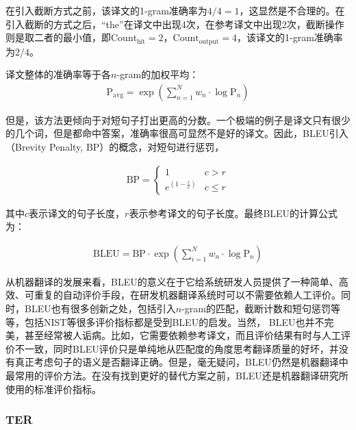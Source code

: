 \parinterval 在引入截断方式之前，该译文的1-gram准确率为$4/4=1$，这显然是不合理的。在引入截断的方式之后，``the''在译文中出现4次，在参考译文中出现2次，截断操作则是取二者的最小值，即$\textrm{Count}_{\textrm{hit}}= 2$，$\textrm{Count}_{\textrm{output}}= 4$，该译文的1-gram准确率为$2/4$。

\parinterval 译文整体的准确率等于各$n$-gram的加权平均：
\begin{eqnarray}
\textrm{P}_{\textrm{avg}}=\exp(\sum_{n=1}^Nw_n\cdot \log{\textrm{P}_n})
\label{eq:1-2}
\end{eqnarray}

\parinterval 但是，该方法更倾向于对短句子打出更高的分数。一个极端的例子是译文只有很少的几个词，但是都命中答案，准确率很高可显然不是好的译文。因此，BLEU引入{\small{}}（Brevity Penalty, BP）的概念，对短句进行惩罚，

\begin{eqnarray}
\textrm{BP}=
\begin{cases}
1& c>r\\
e^{(1-\frac{r}{c})}& c \le r
\end{cases}
\label{eq:1-3}
\end{eqnarray}

\noindent 其中$c$表示译文的句子长度，$r$表示参考译文的句子长度。最终BLEU的计算公式为：

\begin{eqnarray}
\textrm{BLEU}=\textrm{BP} \cdot \exp(\sum_{i=1}^{N}w_n \cdot \log{\textrm{P}_n})
\label{eq:1-4}
\end{eqnarray}

\parinterval 从机器翻译的发展来看，BLEU的意义在于它给系统研发人员提供了一种简单、高效、可重复的自动评价手段，在研发机器翻译系统时可以不需要依赖人工评价。同时，BLEU也有很多创新之处，包括引入$n$-gram的匹配，截断计数和短句惩罚等等，包括NIST等很多评价指标都是受到BLEU的启发。当然， BLEU也并不完美，甚至经常被人诟病。比如，它需要依赖参考译文，而且评价结果有时与人工评价不一致，同时BLEU评价只是单纯地从匹配度的角度思考翻译质量的好坏，并没有真正考虑句子的语义是否翻译正确。但是，毫无疑问，BLEU仍然是机器翻译中最常用的评价方法。在没有找到更好的替代方案之前，BLEU还是机器翻译研究所使用的标准评价指标。


\subsubsection{TER}

